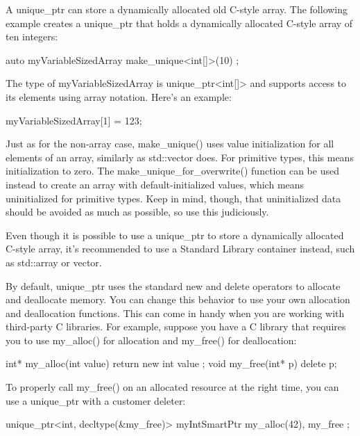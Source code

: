 
A unique\_ptr can store a dynamically allocated old C-style array. The following example creates a unique\_ptr that holds a dynamically allocated C-style array of ten integers:

\begin{cpp}
auto myVariableSizedArray { make_unique<int[]>(10) };
\end{cpp}

The type of myVariableSizedArray is unique\_ptr<int[]> and supports access to its elements using array notation. Here’s an example:

\begin{cpp}
myVariableSizedArray[1] = 123;
\end{cpp}

Just as for the non-array case, make\_unique() uses value initialization for all elements of an array, similarly as std::vector does. For primitive types, this means initialization to zero. The make\_unique\_for\_overwrite() function can be used instead to create an array with default-initialized values, which means uninitialized for primitive types. Keep in mind, though, that uninitialized data should be avoided as much as possible, so use this judiciously.

Even though it is possible to use a unique\_ptr to store a dynamically allocated C-style array, it’s recommended to use a Standard Library container instead, such as std::array or vector.


By default, unique\_ptr uses the standard new and delete operators to allocate and deallocate memory. You can change this behavior to use your own allocation and deallocation functions. This can come in handy when you are working with third-party C libraries. For example, suppose you have a C library that requires you to use my\_alloc() for allocation and my\_free() for deallocation:

\begin{cpp}
int* my_alloc(int value) { return new int { value }; }
void my_free(int* p) { delete p; }
\end{cpp}

To properly call my\_free() on an allocated resource at the right time, you can use a unique\_ptr with a customer deleter:

\begin{cpp}
unique_ptr<int, decltype(&my_free)> myIntSmartPtr { my_alloc(42), my_free };
\end{cpp}

